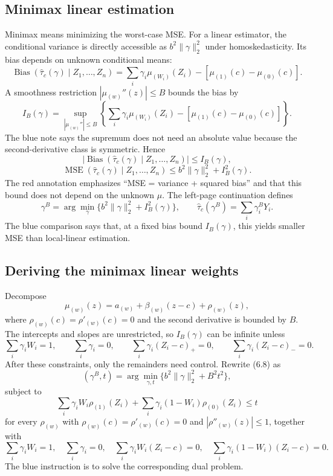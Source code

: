 \subsection{Minimax linear estimation}
Minimax means minimizing the worst-case MSE. For a linear estimator, the conditional variance is directly accessible as $b^2\|\gamma\|_2^2$ under homoskedasticity. Its bias depends on unknown conditional means:
\[
\operatorname{Bias}(\widehat\tau_c(\gamma)\mid Z_1,\ldots,Z_n)
=\sum_i\gamma_i\mu_{(W_i)}(Z_i)-[\mu_{(1)}(c)-\mu_{(0)}(c)].
\]
A smoothness restriction $|\mu_{(w)}''(z)|\leq B$ bounds the bias by
\[
I_B(\gamma)=\sup_{|\mu_{(w)}''|\leq B}
\left\{\sum_i\gamma_i\mu_{(W_i)}(Z_i)-[\mu_{(1)}(c)-\mu_{(0)}(c)]\right\}.
\]
The blue note says the supremum does not need an absolute value because the second-derivative class is symmetric. Hence
\[
|\operatorname{Bias}(\widehat\tau_c(\gamma)\mid Z_1,\ldots,Z_n)|\leq I_B(\gamma),
\]
\[
\operatorname{MSE}(\widehat\tau_c(\gamma)\mid Z_1,\ldots,Z_n)
\leq b^2\|\gamma\|_2^2+I_B^2(\gamma).
\]
The red annotation emphasizes ``MSE = variance + squared bias'' and that this bound does not depend on the unknown $\mu$. The left-page continuation defines
\[
\gamma^B=\arg\min_\gamma\{b^2\|\gamma\|_2^2+I_B^2(\gamma)\},\qquad
\widehat\tau_c(\gamma^B)=\sum_i\gamma_i^B Y_i.
\tag{6.8 in the notes}
\]
The blue comparison says that, at a fixed bias bound $I_B(\gamma)$, this yields smaller MSE than local-linear estimation.
\subsection{Deriving the minimax linear weights}
Decompose
\[
\mu_{(w)}(z)=a_{(w)}+\beta_{(w)}(z-c)+\rho_{(w)}(z),
\]
where $\rho_{(w)}(c)=\rho'_{(w)}(c)=0$ and the second derivative is bounded by $B$. The intercepts and slopes are unrestricted, so $I_B(\gamma)$ can be infinite unless
\[
\sum_i\gamma_iW_i=1,\qquad \sum_i\gamma_i=0,\qquad
\sum_i\gamma_i(Z_i-c)_+=0,\qquad \sum_i\gamma_i(Z_i-c)_-=0.
\]
After these constraints, only the remainders need control. Rewrite (6.8) as
\[
(\gamma^B,t)=\arg\min_{\gamma,t}\{b^2\|\gamma\|_2^2+B^2t^2\},
\]
subject to
\[
\sum_i\gamma_iW_i\rho_{(1)}(Z_i)+\sum_i\gamma_i(1-W_i)\rho_{(0)}(Z_i)\leq t
\]
for every $\rho_{(w)}$ with $\rho_{(w)}(c)=\rho'_{(w)}(c)=0$ and $|\rho''_{(w)}(z)|\leq1$, together with
\[
\sum_i\gamma_iW_i=1,\quad\sum_i\gamma_i=0,\quad
\sum_i\gamma_iW_i(Z_i-c)=0,\quad
\sum_i\gamma_i(1-W_i)(Z_i-c)=0.
\tag{6.10 in the notes}
\]
The blue instruction is to solve the corresponding dual problem.

